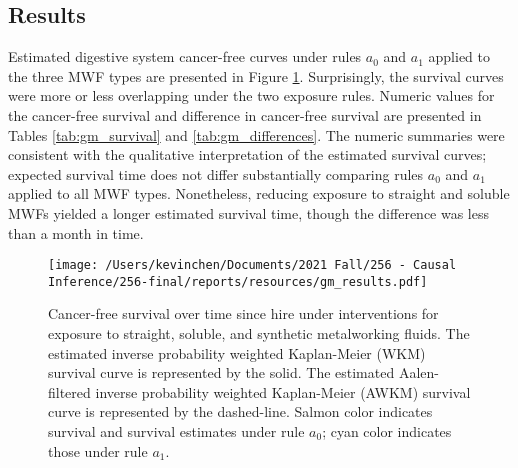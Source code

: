 \documentclass[
  11pt,
]{article}
\begin{document}
\hypertarget{results-1}{%
\subsection{Results}\label{results-1}}

Estimated digestive system cancer-free curves under rules \(a_0\) and
\(a_1\) applied to the three MWF types are presented in Figure
\ref{fig:gm_survival}. Surprisingly, the survival curves were more or
less overlapping under the two exposure rules. Numeric values for the
cancer-free survival and difference in cancer-free survival are
presented in Tables \ref{tab:gm_survival} and \ref{tab:gm_differences}.
The numeric summaries were consistent with the qualitative
interpretation of the estimated survival curves; expected survival time
does not differ substantially comparing rules \(a_0\) and \(a_1\)
applied to all MWF types. Nonetheless, reducing exposure to straight and
soluble MWFs yielded a longer estimated survival time, though the
difference was less than a month in time.

\begin{figure}[h]
\caption{Cancer-free survival over time since hire under interventions for exposure to straight, soluble, and synthetic metalworking fluids. The estimated inverse probability weighted Kaplan-Meier (WKM) survival curve is represented by the solid. The estimated Aalen-filtered inverse probability weighted Kaplan-Meier (AWKM) survival curve is represented by the dashed-line. Salmon color indicates survival and survival estimates under rule $a_0$; cyan color indicates those under rule $a_1$.}
\label{fig:gm_survival}
\begin{center}
\texttt{[image: /Users/kevinchen/Documents/2021 Fall/256 - Causal Inference/256-final/reports/resources/gm\_results.pdf]}
\end{center}
\end{figure}
\end{document}
